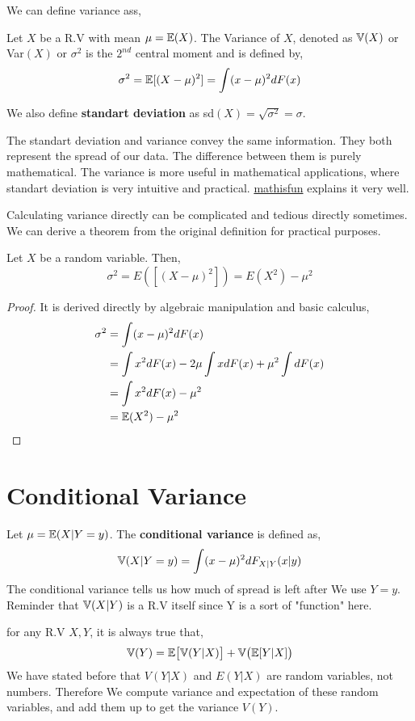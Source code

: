 We can define variance ass,
\begin{definition}
    Let $X$ be a R.V with mean $\mu = {\mathbb{E}}(X)$. The Variance of $X$, denoted as ${\mathbb{V}}(X)$ or  Var$(X)$ or $\sigma ^2$ is the $2^{nd}$ central moment and is defined by,
    \[ \sigma^2 = {\mathbb{E}} [(X- \mu)^2] = \int (x -\mu)^2 dF(x)\]
    
    We also define \textbf{standart deviation} as sd$(X) = \sqrt{\sigma^2}= \sigma$.
\end{definition}
The standart deviation and variance convey the same information. They both represent the spread of our data. 
The difference between them is purely mathematical. The variance is more useful in mathematical applications, where standart deviation is very intuitive and practical. 
\href{https://www.mathsisfun.com/data/standard-deviation.html}{mathisfun} explains it very well.
\par
Calculating variance directly can be complicated  and tedious directly sometimes. We can derive a theorem from the original definition for practical purposes.
\begin{theorem}
    Let $X$ be a random variable. Then,
    \[\sigma^2 = E([ (X-\mu)^2]) = E(X^2) - \mu^2\]
    \begin{proof}
        It is derived directly by algebraic manipulation and basic calculus,
        \begin{align*}
            \sigma^2 &= \int (x- \mu)^2 dF(x)  \\
                     &= \int x^2 dF(x) -2\mu \int x dF(x) + \mu^2 \int dF(x) \\
                     &= \int x^2 dF(x) - \mu^2 \\
                     &= {\mathbb{E}}(X^2) - \mu^2
        \end{align*}
    \end{proof}
\end{theorem}
\section{Conditional Variance}
\begin{definition}
    Let $\mu = {\mathbb{E}} (X |Y=y)$. The \textbf{conditional variance} is defined as,
    \[ {\mathbb{V}}(X| Y=y) = \int (x- \mu)^2 dF_{X|Y}(x|y)\]
    The conditional variance tells us how much of spread is left after  We use $Y=y$. Reminder that ${\mathbb{V}}(X|Y)$ is a R.V itself since Y is a sort of "function" here.
\end{definition}    
\begin{theorem} for any R.V $X,Y$, it is always true that,
    \[{\mathbb{V}}(Y)= {\mathbb{E}}\big[{\mathbb{V}}(Y|X)\big]+ {\mathbb{V}}\big({\mathbb{E}}[Y|X]\big)\]
    We have stated before that $V(Y|X)$ and $E(Y|X)$ are random variables, not numbers. Therefore We compute variance and expectation of these random variables, and add them up to get the variance $V(Y)$.
\end{theorem}
